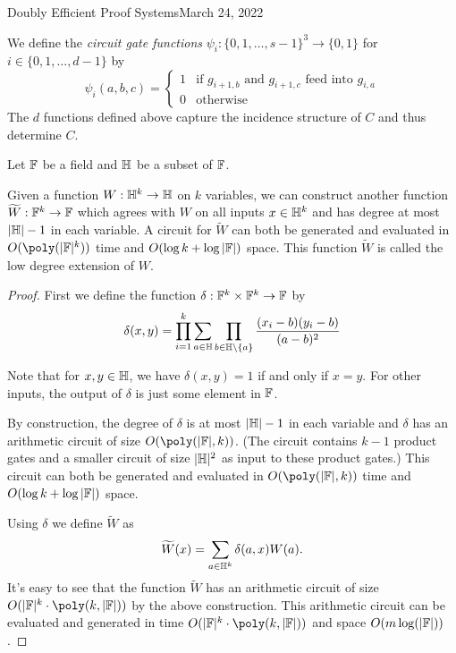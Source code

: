 \begin{lecture}{9}{Doubly Efficient Proof Systems}{March 24, 2022}
\begin{definition}\label{def:psis}
  We define the \emph{circuit gate functions} $\psi_i:\{0,1,\ldots, s-1\}^3 \to
  \{0,1\}$ for $i \in \{0, 1, \ldots, d-1\}$ by
	\[
    \psi_i(a,b,c) = \begin{cases}
      1 &\text{if $g_{i+1,b}$ and $g_{i+1,c}$ feed into $g_{i,a}$}\\
      0 &\text{otherwise}
    \end{cases}
	\]
  The $d$ functions defined above capture the incidence structure of $C$ and
  thus determine $C$.
\end{definition}

Let $\mathbb{F}$ be a field and $\mathbb{H}$ be a subset of $\mathbb{F}$.


\begin{lemma}\label{lem:lde}
  Given a function $W:\mathbb{H}^k \to \mathbb{H}$ on $k$ variables, we can construct another
  function $\widetilde{W}:\mathbb{F}^k \to \mathbb{F}$ which agrees with $W$ on all inputs $x
  \in \mathbb{H}^k$ and has degree at most $|\mathbb{H}|-1$ in each variable. A circuit for
  $\tilde{W}$ can both be generated and evaluated in $O(\poly(|\F|^k))$ time
  and $O(\log k + \log |\mathbb{F}|)$ space. This function $\tilde{W}$ is called the
  low degree extension of $W$.
\end{lemma}

\begin{proof}
  First we define the function $\delta : \mathbb{F}^k \times \mathbb{F}^k \to \mathbb{F}$ by
  \begin{equation}
    \delta(x,y) = \prod_{i=1}^k \sum_{a \in \mathbb{H}} \prod_{b \in \mathbb{H}\setminus\{a\}} \frac{(x_i-b)(y_i-b)}{(a-b)^2}
  \end{equation}

  Note that for $x, y \in \mathbb{H}$, we have $\delta(x, y) = 1$ if and only if $x =
  y$. For other inputs, the output of $\delta$ is just some element in $\mathbb{F}$.

  By construction, the degree of $\delta$ is at most $|\mathbb{H}|-1$ in each variable
  and $\delta$ has an arithmetic circuit of size $O(\poly(|\F|, k))$. (The
  circuit contains $k-1$ product gates and a smaller circuit of size $|\mathbb{H}|^2$
  as input to these product gates.) This circuit can both be generated and
  evaluated in $O(\poly(|\F|, k))$ time and $O(\log k + \log |\mathbb{F}|)$ space.

  Using $\delta$ we define $\widetilde{W}$ as
	\begin{equation*}
    \widetilde{W}(x) = \sum_{a \in \mathbb{H}^k} \delta(a,x) W(a).
	\end{equation*}
  It's easy to see that the function $\widetilde{W}$ has an arithmetic circuit
  of size $O(|\F|^k \cdot \poly(k , |\F|))$ by the above construction. This
  arithmetic circuit can be evaluated and generated in time $O(|\F|^k \cdot
  \poly(k , |\F|))$ and space $O(m \log (|\mathbb{F}|))$.
\end{proof}


\end{lecture}
